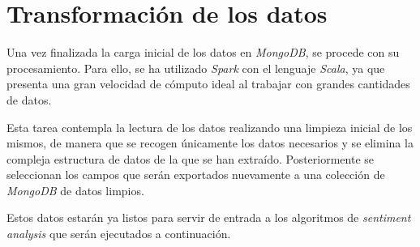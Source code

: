 \section{Transformación de los datos}

Una vez finalizada la carga inicial de los datos en \textit{MongoDB}, se procede con su procesamiento. Para ello, se ha utilizado \textit{Spark} con el lenguaje \textit{Scala}, ya que presenta una gran velocidad de cómputo ideal al trabajar con grandes cantidades de datos.

Esta tarea contempla la lectura de los datos realizando una limpieza inicial de los mismos, de manera que se recogen únicamente los datos necesarios y se elimina la compleja estructura de datos de la que se han extraído. Posteriormente se seleccionan los campos que serán exportados nuevamente a una colección de \textit{MongoDB} de datos limpios.

Estos datos estarán ya listos para servir de entrada a los algoritmos de \textit{sentiment analysis} que serán ejecutados a continuación.